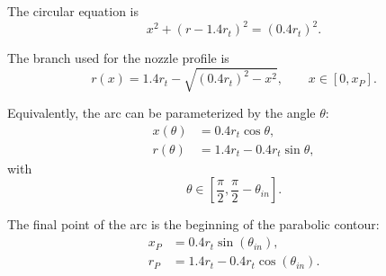 The circular equation is
\begin{equation}
x^2+(r-1.4r_t)^2=(0.4r_t)^2.
\end{equation}

The branch used for the nozzle profile is
\begin{equation}
r(x)=1.4r_t-\sqrt{(0.4r_t)^2-x^2},
\qquad x\in[0,x_P].
\label{eq:sup_arc}
\end{equation}

Equivalently, the arc can be parameterized by the angle $\theta$:
\begin{align}
x(\theta)&=0.4r_t\cos\theta,\\
r(\theta)&=1.4r_t-0.4r_t\sin\theta,
\end{align}
with
\begin{equation}
\theta\in\left[\frac{\pi}{2},\frac{\pi}{2}-\theta_{in}\right].
\end{equation}

The final point of the arc is the beginning of the parabolic contour:
\begin{align}
x_P &=0.4r_t\sin(\theta_{in}),
\label{eq:xP}\\
r_P &=1.4r_t-0.4r_t\cos(\theta_{in}).
\label{eq:yP}
\end{align}

